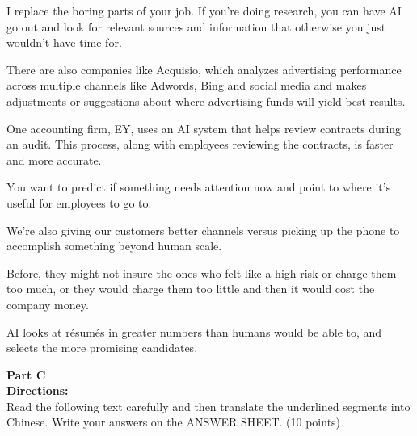 \begin{listmatch}
	\item
I replace the boring parts of your job. If you're doing research, you
can have AI go out and look for relevant sources and information that
otherwise you just wouldn't have time for.

\item
There are also companies like Acquisio, which analyzes advertising
performance across multiple channels like Adwords, Bing and social
media and makes adjustments or suggestions about where advertising
funds will yield best results.


\item
One accounting firm, EY, uses an AI system that helps review contracts
during an audit. This process, along with employees reviewing the
contracts, is faster and more accurate.



\item
You want to predict if something needs attention now and point to
where it's useful for employees to go to.

\item
We're also giving our customers better channels versus picking up the
phone  to accomplish something beyond human scale.

\item
Before, they might not insure the ones who felt like a high risk or
charge them too much, or they would charge them too little and then it
would cost the company money.



\item
AI looks at résumés in greater numbers than humans would be able to,
and selects the more promising candidates.

\end{listmatch}


\newpage
\noindent
\textbf{Part C}\\
\textbf{Directions:}\\
Read the following text carefully and then translate the
underlined segments into Chinese. 
Write your answers on the ANSWER SHEET. (10 points)

\TiGanSpace

